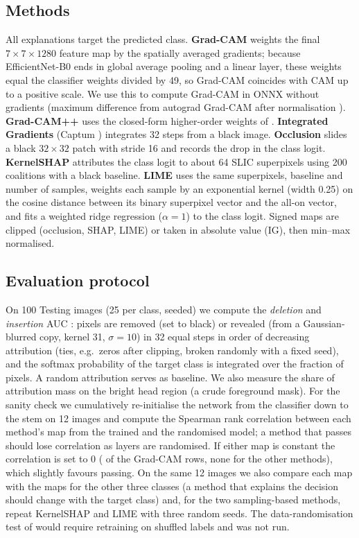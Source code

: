 \documentclass[11pt,a4paper]{article}
\begin{document}
\subsection{Methods}
All explanations target the predicted class. \textbf{Grad-CAM} weights the final $7\times7\times1280$ feature map by the spatially averaged gradients; because EfficientNet-B0 ends in global average pooling and a linear layer, these weights equal the classifier weights divided by 49, so Grad-CAM coincides with CAM up to a positive scale. We use this to compute Grad-CAM in ONNX without gradients (maximum difference from autograd Grad-CAM after normalisation \CamDiff{}). \textbf{Grad-CAM++} uses the closed-form higher-order weights of \citet{chattopadhay2018}. \textbf{Integrated Gradients} (Captum \citep{kokhlikyan2020}) integrates 32 steps from a black image. \textbf{Occlusion} slides a black $32\times32$ patch with stride 16 and records the drop in the class logit. \textbf{KernelSHAP} \citep{lundberg2017} attributes the class logit to about 64 SLIC superpixels \citep{achanta2012} using 200 coalitions with a black baseline. \textbf{LIME} \citep{ribeiro2016} uses the same superpixels, baseline and number of samples, weights each sample by an exponential kernel (width 0.25) on the cosine distance between its binary superpixel vector and the all-on vector, and fits a weighted ridge regression ($\alpha=1$) to the class logit. Signed maps are clipped (occlusion, SHAP, LIME) or taken in absolute value (IG), then min--max normalised.

\subsection{Evaluation protocol}
On 100 Testing images (25 per class, seeded) we compute the \emph{deletion} and \emph{insertion} AUC \citep{petsiuk2018}: pixels are removed (set to black) or revealed (from a Gaussian-blurred copy, kernel 31, $\sigma=10$) in 32 equal steps in order of decreasing attribution (ties, e.g.\ zeros after clipping, broken randomly with a fixed seed), and the softmax probability of the target class is integrated over the fraction of pixels. A random attribution serves as baseline. We also measure the share of attribution mass on the bright head region (a crude foreground mask). For the sanity check \citep{adebayo2018} we cumulatively re-initialise the network from the classifier down to the stem on 12 images and compute the Spearman rank correlation between each method's map from the trained and the randomised model; a method that passes should lose correlation as layers are randomised. If either map is constant the correlation is set to 0 (\SanConstGc{} of the \SanRowsGc{} Grad-CAM rows, none for the other methods), which slightly favours passing. On the same 12 images we also compare each map with the maps for the other three classes (a method that explains the decision should change with the target class) and, for the two sampling-based methods, repeat KernelSHAP and LIME with three random seeds. The data-randomisation test of \citet{adebayo2018} would require retraining on shuffled labels and was not run.
\end{document}
